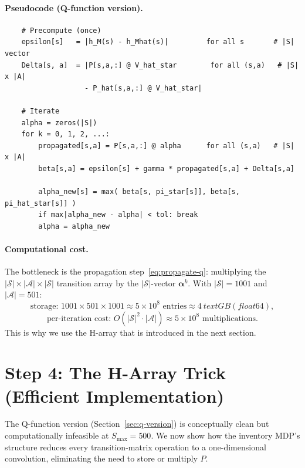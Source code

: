 \documentclass[11pt]{article}
\newcommand{\Smax}{S_{\max}}
\begin{document}
\paragraph{Pseudocode (Q-function version).}
\begin{verbatim}
    # Precompute (once)
    epsilon[s]   = |h_M(s) - h_Mhat(s)|         for all s       # |S| vector
    Delta[s, a]  = |P[s,a,:] @ V_hat_star        for all (s,a)   # |S| x |A|
                   - P_hat[s,a,:] @ V_hat_star|

    # Iterate
    alpha = zeros(|S|)
    for k = 0, 1, 2, ...:
        propagated[s,a] = P[s,a,:] @ alpha      for all (s,a)   # |S| x |A|
        beta[s,a] = epsilon[s] + gamma * propagated[s,a] + Delta[s,a]

        alpha_new[s] = max( beta[s, pi_star[s]], beta[s, pi_hat_star[s]] )
        if max|alpha_new - alpha| < tol: break
        alpha = alpha_new
\end{verbatim}

\paragraph{Computational cost.}
The bottleneck is the propagation step~\eqref{eq:propagate-q}: multiplying
the $|\mathcal{S}| \times |\mathcal{A}| \times |\mathcal{S}|$ transition
array by the $|\mathcal{S}|$-vector $\boldsymbol{\alpha}^k$.  With
$|\mathcal{S}| = 1001$ and $|\mathcal{A}| = 501$:
\[
  \text{storage: } 1001 \times 501 \times 1001 \approx 5 \times 10^8
  \text{ entries} \approx 4\ text{GB (float64)},
\]
\[
  \text{per-iteration cost: } O(|\mathcal{S}|^2 \cdot |\mathcal{A}|)
  \approx 5 \times 10^8 \text{ multiplications}.
\]
This is why we use the H-array that is introduced in the next section.

\section{Step 4: The H-Array Trick (Efficient Implementation)}
\label{sec:h-array}

The Q-function version (Section~\ref{sec:q-version}) is conceptually clean
but computationally infeasible at $\Smax = 500$.  We now show how the
inventory MDP's structure reduces every transition-matrix operation to a
one-dimensional convolution, eliminating the need to store or multiply $P$.
\end{document}
